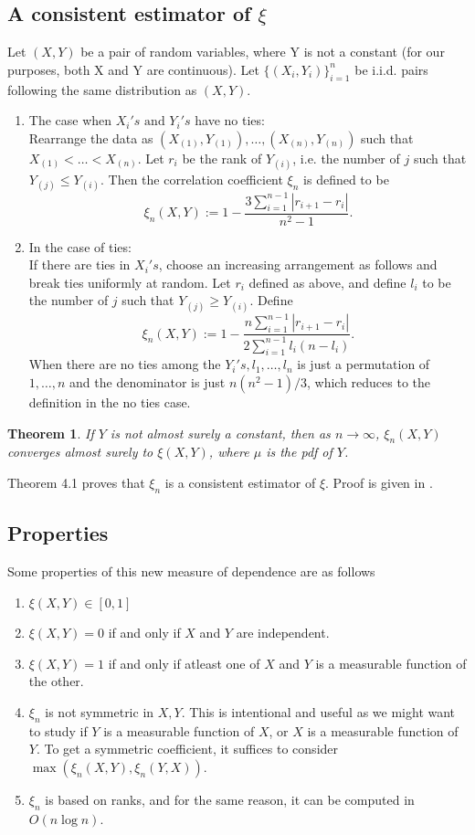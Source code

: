 \documentclass{article}
\newtheorem{theorem}{Theorem}[section]
\begin{document}
	\subsection{A consistent estimator of $\xi$}
		Let $(X, Y)$ be a pair of random variables, where Y is not a constant (for our purposes, both X and Y are continuous).
		Let $\{(X_i, Y_i)\}_{i = 1}^{n}$ be i.i.d. pairs following the same distribution as $(X, Y)$.
		\begin{enumerate}
			\item The case when $X_i's \text{ and } Y_i's$ have no ties: \\
			Rearrange the data as $(X_{(1)}, Y_{(1)}), \dots, (X_{(n)}, Y_{(n)})$ such that $X_{(1)} < \dots < X_{(n)}$. Let $r_i$ be the rank of $Y_{(i)}$, i.e. the number of $j$ such that $Y_{(j)} \leq Y_{(i)}$.  Then the correlation coefficient $\xi_n$ is defined to be
			$$\xi_n(X, Y) := 1-\frac{3\sum_{i=1}^{n-1} |r_{i+1} - r_i|}{n^2-1}.$$

			\item In the case of ties:\\
			If there are ties in $X_i's$, choose an increasing arrangement as follows and break ties uniformly at random. Let $r_i$ defined as above, and define $l_i$ to be the number of $j$ such that $Y_{(j)} \geq Y_{(i)}$. Define
			$$\xi_n(X, Y) := 1-\frac{n\sum_{i=1}^{n-1} |r_{i+1} - r_i|}{2\sum_{i=1}^{n-1}l_i(n-l_i)}.$$
			When there are no ties among the $Y_i's, l_1, \dots, l_n$ is just a permutation of $1, \dots, n$ and the denominator is just $n(n^2-1)/3$, which reduces to the definition in the no ties case.\\
		\end{enumerate}
		\begin{theorem}
			If $Y$ is not almost surely a constant, then as $n \rightarrow \infty$, $\xi_n(X, Y)$ converges almost surely to $\xi(X, Y)$, where $\mu$ is the pdf of $Y$.
		\end{theorem}
		Theorem 4.1 proves that $\xi_n$ is a consistent estimator of $\xi$. Proof is given in \cite{chatterjee2020sourav}.

	\subsection{Properties}
	Some properties of this new measure of dependence are as follows
	\begin{enumerate}
		\item $\xi(X, Y) \in [0, 1]$
		\item $\xi(X, Y) = 0$ if and only if $X$ and $Y$ are independent.
		\item $\xi(X, Y) = 1$ if and only if atleast one of $X$ and $Y$ is a measurable function of the other.
		\item $\xi_n$ is not symmetric in $X, Y$. This is intentional and useful as we might want to study if $Y$ is a measurable function of $X$, or $X$ is a measurable function of $Y$. To get a symmetric coefficient, it suffices to consider $\max(\xi_n(X, Y), \xi_n(Y, X))$.
		\item $\xi_n$ is based on ranks, and for the same reason, it can be computed in $O(n\log n)$.
	\end{enumerate}
\end{document}
